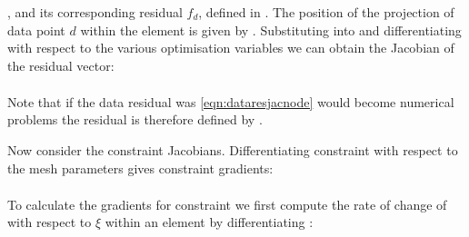 , and its corresponding residual $f_{d}$, defined in
. The position of the projection of data point $d$
within the element is given by .  Substituting
 into  and
differentiating with respect to the various optimisation variables we can
obtain the Jacobian of the residual vector:
\begin{eqnarray}
\end{eqnarray}

Note that if the data residual was
\eqref{eqn:dataresjacnode} would become
numerical problems the residual is therefore defined by
.

Now consider the constraint Jacobians. Differentiating constraint
 with respect to the mesh parameters gives constraint
gradients:
\begin{eqnarray}
\end{eqnarray}

To calculate the gradients for constraint  we first
compute the rate of change of  with respect to $\xi$ within an element
by differentiating :
\begin{equation}
  \label{eqn:delxdelxiinterp}
\end{equation}

